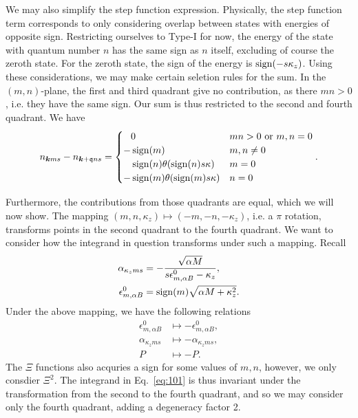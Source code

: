 We may also simplify the step function expression.
Physically, the step function term corresponds to only considering overlap between states with energies of opposite sign.
Restricting ourselves to Type-I for now, the energy of the state with quantum number \( n \) has the same sign as \( n \) itself, excluding of course the zeroth state.
For the zeroth state, the sign of the energy is \( \operatorname{sign}(-s \kappa_z) \).
Using these considerations, we may make certain seletion rules for the sum.
In the \( (m,n) \)-plane, the first and third quadrant give no contribution, as there \( m n > 0 \), i.e. they have the same sign.
Our sum is thus restricted to the second and fourth quadrant.
We have
\begin{equation}
  \label{eq:102}
  n_{\bm{k} m s} - n_{\bm{k} + \mathfrak{q} n s} =
  \begin{cases}
    \phantom{-} 0 & m n > 0 \text{ or  } m,n = 0\\
    - \operatorname{sign}(m) & m,n \neq 0\\
    \phantom{-} \operatorname{sign}(n) \theta(\operatorname{sign}(n) s \kappa) & m = 0\\
    -\operatorname{sign}(m) \theta(\operatorname{sign}(m) s \kappa) & n = 0
  \end{cases}.
\end{equation}

Furthermore, the contributions from those quadrants are equal, which we will now show.
The mapping \( (m,n, \kappa_z) \mapsto (-m, -n, -\kappa_z) \), i.e. a \( \pi \) rotation, transforms points in the second quadrant to the fourth quadrant.
We want to consider how the integrand in question transforms under such a mapping.
Recall
\begin{align*}
  \alpha_{\kappa_z m s} &= - \frac{\sqrt{\alpha M} }{s \epsilon_{m, \alpha B}^0 - \kappa_z},\\
  \epsilon_{m, \alpha B}^0 &= \operatorname{sign}(m) \sqrt{\alpha M + \kappa_z^2}.
\end{align*}
Under the above mapping, we have the following relations
\begin{align}
  \label{eq:92}
  \epsilon_{m, \alpha B}^0 &\mapsto -\epsilon_{m, \alpha B}^0,\\
  \alpha_{\kappa_z m s} &\mapsto -\alpha_{\kappa_z m s},\\
  P &\mapsto -P.
\end{align}
The \( \Xi \) functions also acquries a sign for some values of \( m,n \), however, we only consdier \( \Xi^2 \).
The integrand in Eq.~\eqref{eq:101} is thus invariant under the transformation from the second to the fourth quadrant, and so we may consider only the fourth quadrant, adding a degeneracy factor 2.


